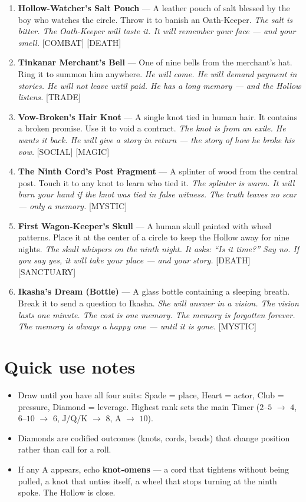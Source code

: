 \begin{enumerate}
\item \textbf{Hollow-Watcher's Salt Pouch} --- A leather pouch of salt blessed by the boy who watches the circle. Throw it to banish an Oath-Keeper.
  \hfill \textit{The salt is bitter. The Oath-Keeper will taste it. It will remember your face --- and your smell.} [COMBAT] [DEATH]
\item \textbf{Tinkanar Merchant's Bell} --- One of nine bells from the merchant's hat. Ring it to summon him anywhere.
  \hfill \textit{He will come. He will demand payment in stories. He will not leave until paid. He has a long memory --- and the Hollow listens.} [TRADE]
\item[J] \textbf{Vow-Broken's Hair Knot} --- A single knot tied in human hair. It contains a broken promise. Use it to void a contract.
  \hfill \textit{The knot is from an exile. He wants it back. He will give a story in return --- the story of how he broke his vow.} [SOCIAL] [MAGIC]
\item[Q] \textbf{The Ninth Cord's Post Fragment} --- A splinter of wood from the central post. Touch it to any knot to learn who tied it.
  \hfill \textit{The splinter is warm. It will burn your hand if the knot was tied in false witness. The truth leaves no scar --- only a memory.} [MYSTIC]
\item[K] \textbf{First Wagon-Keeper's Skull} --- A human skull painted with wheel patterns. Place it at the center of a circle to keep the Hollow away for nine nights.
  \hfill \textit{The skull whispers on the ninth night. It asks: ``Is it time?'' Say no. If you say yes, it will take your place --- and your story.} [DEATH] [SANCTUARY]
\item[A] \textbf{Ikasha's Dream (Bottle)} --- A glass bottle containing a sleeping breath. Break it to send a question to Ikasha.
  \hfill \textit{She will answer in a vision. The vision lasts one minute. The cost is one memory. The memory is forgotten forever. The memory is always a happy one --- until it is gone.} [MYSTIC]
\end{enumerate}

\section*{Quick use notes}
\label{sec:tulkani-quick-use}
\begin{itemize}
\item Draw until you have all four suits: Spade = place, Heart = actor, Club = pressure, Diamond = leverage. Highest rank sets the main Timer ($2$--$5$ $\rightarrow$ $4$, $6$--$10$ $\rightarrow$ $6$, J/Q/K $\rightarrow$ $8$, A $\rightarrow$ $10$).
\item Diamonds are codified outcomes (knots, cords, beads) that change position rather than call for a roll.
\item If any A appears, echo \textbf{knot-omens} --- a cord that tightens without being pulled, a knot that unties itself, a wheel that stops turning at the ninth spoke. The Hollow is close.
\end{itemize}


